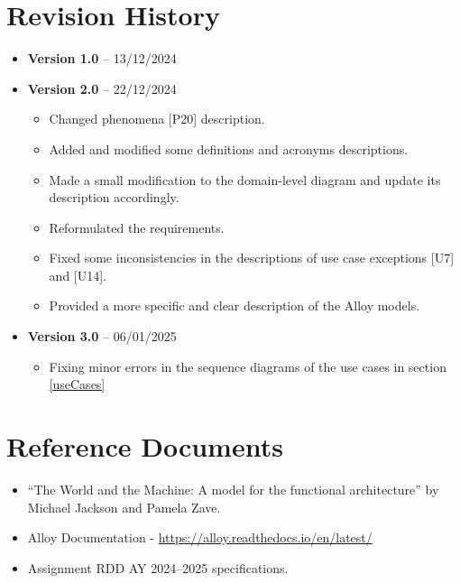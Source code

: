 \section{Revision History}\label{sec:revisionhistory}
\begin{itemize}
    \item \textbf{Version 1.0} – 13/12/2024
    \item \textbf{Version 2.0} – 22/12/2024
            \begin{itemize}
                \item Changed phenomena [P20] description.
                \item Added and modified some definitions and acronyms descriptions.
                \item Made a small modification to the domain-level diagram and update its description accordingly.
                \item Reformulated the requirements.
                \item Fixed some inconsistencies in the descriptions of use case exceptions [U7] and [U14].
                \item Provided a more specific and clear description of the Alloy models.
            \end{itemize}
    \item \textbf{Version 3.0} – 06/01/2025
            \begin{itemize}
                \item Fixing minor errors in the sequence diagrams of the use cases in section \ref{useCases}
            \end{itemize}
\end{itemize}

\section{Reference Documents}\label{sec:reference}
\begin{itemize}
    \item ``The World and the Machine: A model for the functional architecture'' by Michael Jackson and Pamela Zave.
    \item Alloy Documentation - \url{https://alloy.readthedocs.io/en/latest/}
    \item Assignment RDD AY 2024–2025 specifications.
\end{itemize}

